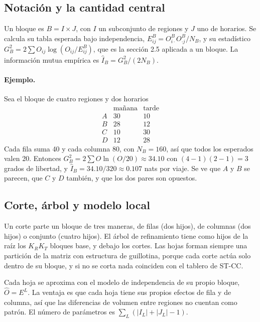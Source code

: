 \documentclass[11pt,a4paper]{article}
\begin{document}
\subsection{Notación y la cantidad central}

Un bloque es $B=I\times J$, con $I$ un subconjunto de regiones y $J$ uno de
horarios. Se calcula su tabla esperada bajo independencia,
$E^B_{ij}=O^B_{i\cdot}O^B_{\cdot j}/N_B$, y su estadístico
$G^2_B=2\sum O_{ij}\log(O_{ij}/E^B_{ij})$, que es la sección 2.5 aplicada a un
bloque. La información mutua empírica es $\hat I_B=G^2_B/(2N_B)$.

\paragraph{Ejemplo.} Sea el bloque de cuatro regiones y dos horarios
\[
\begin{array}{c|cc}
 & \text{mañana} & \text{tarde}\\\hline
A & 30 & 10\\ B & 28 & 12\\ C & 10 & 30\\ D & 12 & 28
\end{array}
\]
Cada fila suma 40 y cada columna 80, con $N_B=160$, así que todos los esperados
valen 20. Entonces
$G^2_B=2\sum O\ln(O/20)\approx 34.10$ con $(4-1)(2-1)=3$ grados de libertad, y
$\hat I_B=34.10/320\approx 0.107$ nats por viaje. Se ve que $A$ y $B$ se parecen,
que $C$ y $D$ también, y que los dos pares son opuestos.

\subsection{Corte, árbol y modelo local}

Un corte parte un bloque de tres maneras, de filas (dos hijos), de columnas (dos
hijos) o conjunto (cuatro hijos). El árbol de refinamiento tiene como hijos de la
raíz los $K_RK_T$ bloques base, y debajo los cortes. Las hojas forman siempre una
partición de la matriz con estructura de guillotina, porque cada corte actúa solo
dentro de su bloque, y si no se corta nada coinciden con el tablero de ST-CC.

Cada hoja se aproxima con el modelo de independencia de su propio bloque,
$\hat O=E^L$. La ventaja es que cada hoja tiene sus propios efectos de fila y de
columna, así que las diferencias de volumen entre regiones no cuentan como patrón.
El número de parámetros es $\sum_L(|I_L|+|J_L|-1)$.
\end{document}

